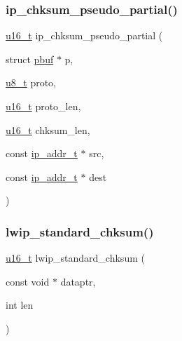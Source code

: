 \subsubsection{\texorpdfstring{ip\+\_\+chksum\+\_\+pseudo\+\_\+partial()}{ip\_chksum\_pseudo\_partial()}}
{\footnotesize\ttfamily \hyperlink{group__compiler__abstraction_ga77570ac4fcab86864fa1916e55676da2}{u16\+\_\+t} ip\+\_\+chksum\+\_\+pseudo\+\_\+partial (\begin{DoxyParamCaption}\item[{struct \hyperlink{structpbuf}{pbuf} $\ast$}]{p,  }\item[{\hyperlink{group__compiler__abstraction_ga4caecabca98b43919dd11be1c0d4cd8e}{u8\+\_\+t}}]{proto,  }\item[{\hyperlink{group__compiler__abstraction_ga77570ac4fcab86864fa1916e55676da2}{u16\+\_\+t}}]{proto\+\_\+len,  }\item[{\hyperlink{group__compiler__abstraction_ga77570ac4fcab86864fa1916e55676da2}{u16\+\_\+t}}]{chksum\+\_\+len,  }\item[{const \hyperlink{native_2lwip_2src_2include_2lwip_2ip__addr_8h_a88b43639738c4de2d3cd22e3a1fd7696}{ip\+\_\+addr\+\_\+t} $\ast$}]{src,  }\item[{const \hyperlink{native_2lwip_2src_2include_2lwip_2ip__addr_8h_a88b43639738c4de2d3cd22e3a1fd7696}{ip\+\_\+addr\+\_\+t} $\ast$}]{dest }\end{DoxyParamCaption})}

\mbox{\label{openmote-cc2538_2lwip_2src_2core_2inet__chksum_8c_a4c8d40559878aa9bf6bfce8d8ab8a72b}} 
\subsubsection{\texorpdfstring{lwip\+\_\+standard\+\_\+chksum()}{lwip\_standard\_chksum()}}
{\footnotesize\ttfamily \hyperlink{group__compiler__abstraction_ga77570ac4fcab86864fa1916e55676da2}{u16\+\_\+t} lwip\+\_\+standard\+\_\+chksum (\begin{DoxyParamCaption}\item[{const void $\ast$}]{dataptr,  }\item[{int}]{len }\end{DoxyParamCaption})}

